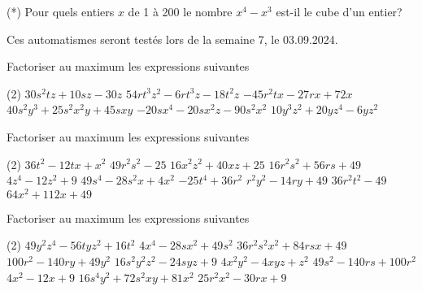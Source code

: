 \documentclass[a4paper,12pt]{report}
\begin{document}
\begin{exo}
(*) Pour quels entiers $x$ de 1 à 200 le nombre $x^4-x^3$ est-il le cube d'un entier?
\end{exo}
Ces automatismes seront testés lors de la semaine 7, le 03.09.2024.

\begin{auto}Factoriser au maximum les expressions suivantes

\begin{tasks}(2)
	\task $30 s^2 t z + 10 s z-30 z$
	\task $54 r t^3 z^2-6 r t^3 z-18 t^2 z$
	\task $-45 r^2 t x-27 r x + 72 x$
	\task $40 s^2 y^3 + 25 s^2 x^2 y + 45 s x y$
	\task $-20 s x^4-20 s x^2 z-90 s^2 x^2$
	\task $10 y^3 z^2 + 20 y z^4-6 y z^2$
\end{tasks}
\end{auto}

\begin{auto}Factoriser au maximum les expressions suivantes

\begin{tasks}(2)
	\task $36 t^2-12 t x + x^2$
	\task $49 r^2 s^2-25 $
	\task $16 x^2 z^2 + 40 x z + 25 $
	\task $16 r^2 s^2 + 56 r s + 49 $
	\task $4 z^4-12 z^2 + 9 $
	\task $49 s^4-28 s^2 x + 4 x^2$
	\task $-25 t^4 + 36 r^2$
	\task $r^2 y^2-14 r y + 49 $
	\task $36 r^2 t^2-49 $
	\task $64 x^2 + 112 x + 49 $
\end{tasks}
\end{auto}

\begin{auto}Factoriser au maximum les expressions suivantes

\begin{tasks}(2)
	\task $49 y^2 z^4-56 t y z^2 + 16 t^2$
	\task $4 x^4-28 s x^2 + 49 s^2$
	\task $36 r^2 s^2 x^2 + 84 r s x + 49 $
	\task $100 r^2-140 r y + 49 y^2$
	\task $16 s^2 y^2 z^2-24 s y z + 9 $
	\task $4 x^2 y^2-4 x y z + z^2$
	\task $49 s^2-140 r s + 100 r^2$
	\task $4 x^2-12 x + 9 $
	\task $16 s^4 y^2 + 72 s^2 x y + 81 x^2$
	\task $25 r^2 x^2-30 r x + 9 $
\end{tasks}
\end{auto}
\end{document}
